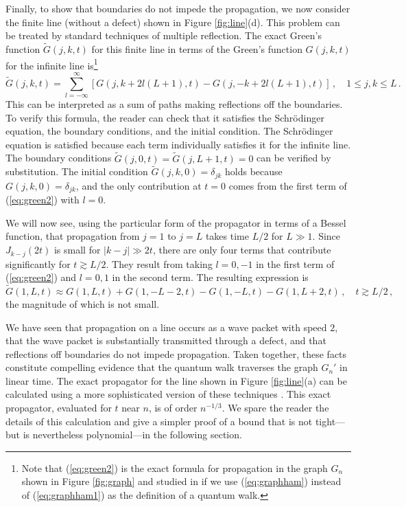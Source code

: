 \documentclass[aps,11pt,twoside,nofootinbib,tightenlines,superscriptaddress,preprintnumbers]{revtex4}
\newcommand{\<}{\langle}
\renewcommand{\>}{\rangle}
\newcommand{\be}{\begin{equation}}
\newcommand{\ee}{\end{equation}}
\begin{document}
Finally, to show that boundaries do not impede the propagation, we now
consider the finite line (without a defect) shown in Figure
\ref{fig:line}(d).  This problem can be treated by standard techniques of
multiple reflection.  The exact Green's function $\tilde G(j,k,t)$ for
this finite line in terms of the Green's function $G(j,k,t)$ for the
infinite line is\footnote{Note that (\ref{eq:green2}) is the exact formula
for propagation in the graph $G_n$ shown in Figure \ref{fig:graph} and
studied in \cite{CFG02} if we use (\ref{eq:graphham}) instead of
(\ref{eq:graphham1}) as the definition of a quantum walk.}
\be
\label{eq:green2}
  \tilde G(j,k,t) = 
  \sum_{l=-\infty}^\infty \left[G(j,k+2l(L+1),t) -
  G(j,-k+2l(L+1),t)\right]
\,, \quad
  1 \le j,k \le L
\,.
\ee
This can be interpreted as a sum of paths making reflections off the
boundaries.  To verify this formula, the reader can check that it
satisfies the Schr\"odinger equation, the boundary conditions, and the
initial condition.  The Schr\"odinger equation is satisfied because each
term individually satisfies it for the infinite line.  The boundary
conditions $\tilde G(j,0,t)=\tilde G(j,L+1,t)=0$ can be verified by
substitution.  The initial condition $\tilde G(j,k,0)=\delta_{jk}$ holds
because $G(j,k,0)=\delta_{jk}$, and the only contribution at $t=0$ comes
from the first term of (\ref{eq:green2}) with $l=0$.

We will now see, using the particular form of the propagator in terms of a
Bessel function, that propagation from $j=1$ to $j=L$ takes time $L/2$ for
$L \gg 1$.  Since $J_{k-j}(2t)$ is small for $|k-j| \gg 2t$, there are
only four terms that contribute significantly for $t \gtrsim L/2$.  They
result from taking $l=0,-1$ in the first term of (\ref{eq:green2}) and
$l=0,1$ in the second term.  The resulting expression is
\be
  \tilde G(1,L,t) \approx G(1,L,t)+G(1,-L-2,t)-G(1,-L,t)-G(1,L+2,t)
  \,, \quad t \gtrsim L/2
\,,
\ee
the magnitude of which is not small.

We have seen that propagation on a line occurs as a wave packet with speed
$2$, that the wave packet is substantially transmitted through a defect,
and that reflections off boundaries do not impede propagation.  Taken
together, these facts constitute compelling evidence that the quantum walk
traverses the graph $G_n'$ in linear time.  The exact propagator for the
line shown in Figure \ref{fig:line}(a) can be calculated using a more
sophisticated version of these techniques \cite{GoldComm}.  This exact
propagator, evaluated for $t$ near $n$, is of order $n^{-1/3}$.  We spare
the reader the details of this calculation and give a simpler proof of a
bound that is not tight---but is nevertheless polynomial---in the
following section.
\end{document}
